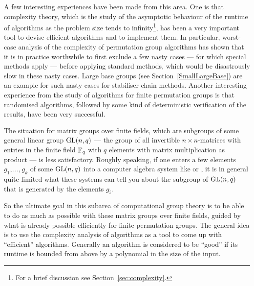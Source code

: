 A few interesting experiences have been made from this area. One is that 
complexity theory,
%
which is the study of the asymptotic behaviour of the runtime of algorithms 
as the problem size tends to infinity\footnote{For a brief discussion see 
Section~\ref{sec:complexity}.}, has been a very important tool to
devise efficient algorithms and to implement them. In particular,
worst-case analysis of the complexity of permutation group 
algorithms has shown that
%
it is in practice worthwhile to first exclude a few nasty cases ---
for which special methods apply --- before applying standard methods,
which would be disastrously slow in these nasty cases. Large base
groups (see Section~\ref{SmallLargeBase}) are an example for such
nasty cases for stabiliser chain methods.
Another interesting
experience from the study of algorithms for finite permutation groups 
is that randomised algorithms, followed by some kind of
deterministic verification of the results, have been very successful.
%

The situation for matrix groups over finite fields, which are subgroups 
of some general linear group $\GL(n,q)$ --- the group of all
invertible $n \times n$-matrices with entries in the finite field
$\mathbb{F}_q$ with $q$ elements with matrix multiplication as product ---
is less satisfactory. Roughly speaking, if one enters a few
elements $g_1, \ldots, g_k$ of some $\GL(n,q)$ into a computer algebra 
system like {\GAP} or {\MAGMA}, it is in general quite limited what
these systems can tell you about the subgroup of $\GL(n,q)$ that is
generated by the elements $g_i$.

So the ultimate goal in this subarea of computational group theory
is to be able to do as much as possible with these matrix groups over
finite fields, guided by what is already possible efficiently for
finite permutation groups. The general idea is to use the complexity
analysis of algorithms as a tool to come up with ``efficient''
algorithms. Generally an algorithm is considered to be ``good'' if
its runtime is bounded from above by a polynomial in the size of the
input.


